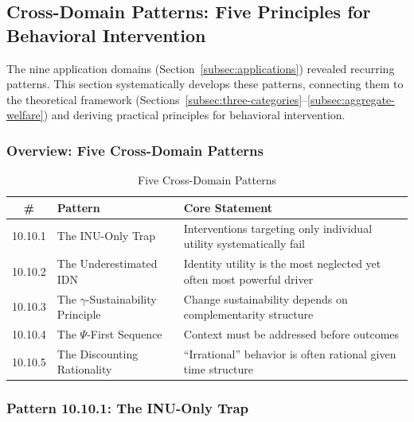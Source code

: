 \subsection{Cross-Domain Patterns: Five Principles for Behavioral Intervention}
\label{subsec:cross-domain-patterns}


The nine application domains (Section~\ref{subsec:applications}) revealed 
recurring patterns. This section systematically develops these patterns,
connecting them to the theoretical framework (Sections~\ref{subsec:three-categories}--\ref{subsec:aggregate-welfare})
and deriving practical principles for behavioral intervention.

\subsubsection{Overview: Five Cross-Domain Patterns}

\begin{table}[htbp]
\centering
\caption{Five Cross-Domain Patterns}
\label{tab:five-patterns}
\renewcommand{\arraystretch}{1.4}
\begin{tabular}{@{}clp{7cm}@{}}
\toprule
\textbf{\#} & \textbf{Pattern} & \textbf{Core Statement} \\
\midrule
10.10.1 & The INU-Only Trap & Interventions targeting only individual utility systematically fail \\
10.10.2 & The Underestimated IDN & Identity utility is the most neglected yet often most powerful driver \\
10.10.3 & The $\gamma$-Sustainability Principle & Change sustainability depends on complementarity structure \\
10.10.4 & The $\Psi$-First Sequence & Context must be addressed before outcomes \\
10.10.5 & The Discounting Rationality & ``Irrational'' behavior is often rational given time structure \\
\bottomrule
\end{tabular}
\end{table}

\subsubsection{Pattern 10.10.1: The INU-Only Trap}
\label{subsubsec:inu-only-trap}

